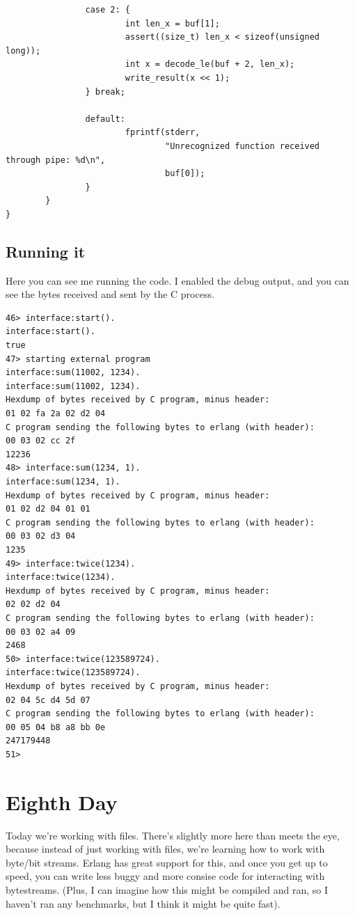 \documentclass[11pt]{article}
\begin{document}
\begin{verbatim}
                case 2: {
                        int len_x = buf[1];
                        assert((size_t) len_x < sizeof(unsigned long));
                        int x = decode_le(buf + 2, len_x);
                        write_result(x << 1);
                } break;

                default:
                        fprintf(stderr,
                                "Unrecognized function received through pipe: %d\n",
                                buf[0]);
                }
        }
}
\end{verbatim}

\subsection{Running it}
\label{sec:org41fce95}
Here you can see me running the code. I enabled the debug output,
and you can see the bytes received and sent by the C process.

\begin{verbatim}
46> interface:start().
interface:start().
true
47> starting external program
interface:sum(11002, 1234).
interface:sum(11002, 1234).
Hexdump of bytes received by C program, minus header:
01 02 fa 2a 02 d2 04 
C program sending the following bytes to erlang (with header):
00 03 02 cc 2f 
12236
48> interface:sum(1234, 1).
interface:sum(1234, 1).
Hexdump of bytes received by C program, minus header:
01 02 d2 04 01 01 
C program sending the following bytes to erlang (with header):
00 03 02 d3 04 
1235
49> interface:twice(1234).
interface:twice(1234).
Hexdump of bytes received by C program, minus header:
02 02 d2 04 
C program sending the following bytes to erlang (with header):
00 03 02 a4 09 
2468
50> interface:twice(123589724).
interface:twice(123589724).
Hexdump of bytes received by C program, minus header:
02 04 5c d4 5d 07 
C program sending the following bytes to erlang (with header):
00 05 04 b8 a8 bb 0e 
247179448
51> 
\end{verbatim}
\section{Eighth Day}
\label{sec:org31cbff5}
Today we're working with files. There's slightly more here than
meets the eye, because instead of just working with files, we're
learning how to work with byte/bit streams. Erlang has great support
for this, and once you get up to speed, you can write less buggy and
more consise code for interacting with bytestreams. (Plus, I can
imagine how this might be compiled and ran, so I haven't ran any
benchmarks, but I think it might be quite fast).
\end{document}
